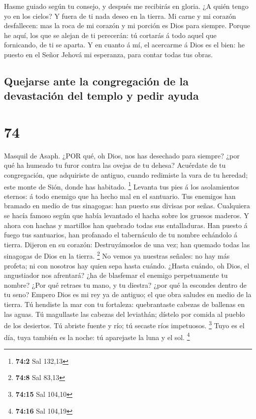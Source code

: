  Hasme guiado según tu consejo, y después me recibirás en
gloria.  ¿A quién tengo yo en los cielos? Y fuera de ti
nada deseo en la tierra.  Mi carne y mi corazón
desfallecen: mas la roca de mi corazón y mi porción es Dios para
siempre.  Porque he aquí, los que se alejan de ti
perecerán: tú cortarás á todo aquel que fornicando, de ti se aparta.
 Y en cuanto á mí, el acercarme á Dios es el bien: he
puesto en el Señor Jehová mi esperanza, para contar todas tus obras.

\hypertarget{quejarse-ante-la-congregaciuxf3n-de-la-devastaciuxf3n-del-templo-y-pedir-ayuda}{%
\subsection{Quejarse ante la congregación de la devastación del templo y
pedir
ayuda}\label{quejarse-ante-la-congregaciuxf3n-de-la-devastaciuxf3n-del-templo-y-pedir-ayuda}}

\hypertarget{section-73}{%
\section{74}\label{section-73}}

 Masquil de Asaph. ¿POR qué, oh Dios, nos has desechado para
siempre? ¿por qué ha humeado tu furor contra las ovejas de tu dehesa?
 Acuérdate de tu congregación, que adquiriste de antiguo,
cuando redimiste la vara de tu heredad; este monte de Sión, donde has
habitado. \footnote{\textbf{74:2} Sal 132,13}  Levanta tus
pies á los asolamientos eternos: á todo enemigo que ha hecho mal en el
santuario.  Tus enemigos han bramado en medio de tus
sinagogas: han puesto sus divisas por señas.  Cualquiera se
hacía famoso según que había levantado el hacha sobre los gruesos
maderos.  Y ahora con hachas y martillos han quebrado todas
sus entalladuras.  Han puesto á fuego tus santuarios, han
profanado el tabernáculo de tu nombre echándolo á tierra. 
Dijeron en su corazón: Destruyámoslos de una vez; han quemado todas las
sinagogas de Dios en la tierra. \footnote{\textbf{74:8} Sal 83,13}
 No vemos ya nuestras señales: no hay más profeta; ni con
nosotros hay quien sepa hasta cuándo.  ¿Hasta cuándo, oh
Dios, el angustiador nos afrentará? ¿ha de blasfemar el enemigo
perpetuamente tu nombre?  ¿Por qué retraes tu mano, y tu
diestra? ¿por qué la escondes dentro de tu seno?  Empero
Dios es mi rey ya de antiguo; el que obra saludes en medio de la tierra.
 Tú hendiste la mar con tu fortaleza: quebrantaste cabezas
de ballenas en las aguas.  Tú magullaste las cabezas del
leviathán; dístelo por comida al pueblo de los desiertos. 
Tú abriste fuente y río; tú secaste ríos impetuosos. \footnote{\textbf{74:15}
  Sal 104,10}  Tuyo es el día, tuya también es la noche: tú
aparejaste la luna y el sol. \footnote{\textbf{74:16} Sal 104,19}

